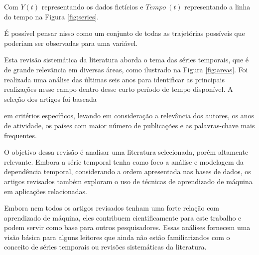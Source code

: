

Com $Y(t)$ representando os dados fictícios e $Tempo \ (t)$ representando a linha do tempo na Figura \ref{fig:series}.

É possível pensar nisso como um conjunto de todas as trajetórias possíveis que poderiam ser observadas para uma variável.

Esta revisão sistemática da literatura aborda o tema das séries temporais, que é de grande relevância em diversas áreas, como ilustrado na Figura \ref{fig:areas}. Foi realizada uma análise das últimas seis anos para identificar as principais realizações nesse campo dentro desse curto período de tempo disponível. A seleção dos artigos foi baseada

em critérios específicos, levando em consideração a relevância dos autores, os anos de atividade, os países com maior número de publicações e as palavras-chave mais frequentes.

O objetivo dessa revisão é analisar uma literatura selecionada, porém altamente relevante. Embora a série temporal tenha como foco a análise e modelagem da dependência temporal, considerando a ordem apresentada nas bases de dados, os artigos revisados também exploram o uso de técnicas de aprendizado de máquina em aplicações relacionadas.

Embora nem todos os artigos revisados tenham uma forte relação com aprendizado de máquina, eles contribuem cientificamente para este trabalho e podem servir como base para outros pesquisadores. Essas análises fornecem uma visão básica para alguns leitores que ainda não estão familiarizados com o conceito de séries temporais ou revisões sistemáticas da literatura.
